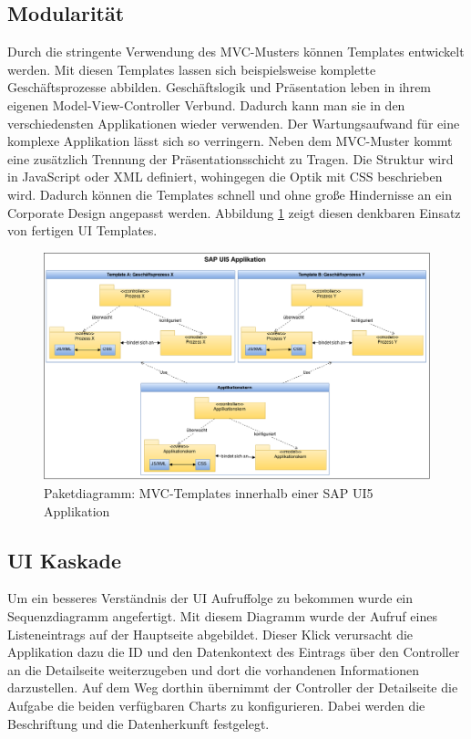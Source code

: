 \newpage
\subsection{Modularität}
Durch die stringente Verwendung des MVC-Musters können Templates entwickelt werden. Mit diesen Templates lassen sich beispielsweise komplette Geschäftsprozesse abbilden. Geschäftslogik und Präsentation leben in ihrem eigenen Model-View-Controller Verbund. Dadurch kann man sie in den verschiedensten Applikationen wieder verwenden. Der Wartungsaufwand für eine komplexe Applikation lässt sich so verringern. Neben dem MVC-Muster kommt eine zusätzlich Trennung der Präsentationsschicht zu Tragen. Die Struktur wird in JavaScript oder XML definiert, wohingegen die Optik mit CSS beschrieben wird. Dadurch können die Templates schnell und ohne große Hindernisse an ein Corporate Design angepasst werden. Abbildung \ref{fig:sapui5mvctemplates} zeigt diesen denkbaren Einsatz von fertigen UI Templates.

\vspace{1em}
\begin{figure}[htb]
  \centering
  \includegraphics[width=1\linewidth,angle=90]{abb/sapui5_mvc_templates}
  \caption[Paketdiagramm: MVC-Templates innerhalb einer SAP UI5 Applikation]{Paketdiagramm: MVC-Templates innerhalb einer SAP UI5 Applikation}
  \label{fig:sapui5mvctemplates}
\end{figure}

\newpage
\subsection{UI Kaskade}
Um ein besseres Verständnis der UI Aufruffolge zu bekommen wurde ein Sequenzdiagramm angefertigt. Mit diesem Diagramm wurde der Aufruf eines Listeneintrags auf der Hauptseite abgebildet. Dieser Klick verursacht die Applikation dazu die ID und den Datenkontext des Eintrags über den Controller an die Detailseite weiterzugeben und dort die vorhandenen Informationen darzustellen. Auf dem Weg dorthin übernimmt der Controller der Detailseite die Aufgabe die beiden verfügbaren Charts zu konfigurieren. Dabei werden die Beschriftung und die Datenherkunft festgelegt.

